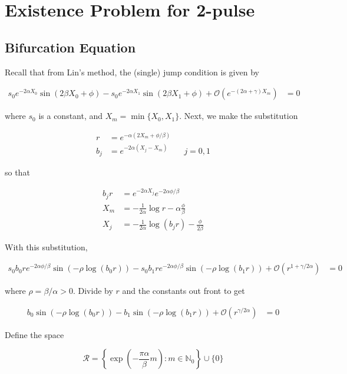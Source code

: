 \documentclass[12pt]{article}
\def\N{{\mathbb N}}
\begin{document}
\section{Existence Problem for 2-pulse}

\subsection{Bifurcation Equation}

Recall that from Lin's method, the (single) jump condition is given by

\begin{align}\label{jumpcond1}
s_0 e^{-2 \alpha X_0} \sin(2 \beta X_0 + \phi) - s_0 e^{-2 \alpha X_1} \sin(2 \beta X_1 + \phi) + \mathcal{O}(e^{-(2 \alpha + \gamma) X_m}) &= 0
\end{align}

where $s_0$ is a constant, and $X_m = \min\{X_0,X_1\}$. Next, we make the substitution

\begin{align}
r &= e^{-\alpha(2 X_m + \phi/\beta)} \\
b_j &= e^{-2 \alpha(X_j - X_m)} && j = 0, 1
\end{align}

so that

\begin{align*}
b_j r &= e^{-2 \alpha X_j}e^{-2\alpha \phi/\beta} \\
X_m &= -\frac{1}{2\alpha}\log r - \alpha \frac{\phi}{\beta} \\
X_j &= -\frac{1}{2\alpha}\log(b_j r) - \frac{\phi}{2 \beta} 
\end{align*}

With this substitution,

\begin{align*}
s_0 b_0 r e^{-2\alpha \phi/\beta} \sin(-\rho \log(b_0 r)) - s_0 b_1 r e^{-2\alpha \phi/\beta} \sin(-\rho \log(b_1 r)) + \mathcal{O}(r^{1 + \gamma / 2 \alpha}) &= 0
\end{align*}

where $\rho = \beta / \alpha > 0$. Divide by $r$ and the constants out front to get

\begin{align}\label{jumpcond2}
b_0 \sin(-\rho \log(b_0 r)) - b_1 \sin(-\rho \log(b_1 r)) + \mathcal{O}(r^{\gamma / 2 \alpha}) &= 0
\end{align}

Define the space

\begin{equation}\label{setR}
\mathcal{R} = \left\{ \exp\left(-\frac{\pi \alpha}{\beta}m\right) : m \in \N_0 \right\} \cup \{ 0 \}
\end{equation}
\end{document}
